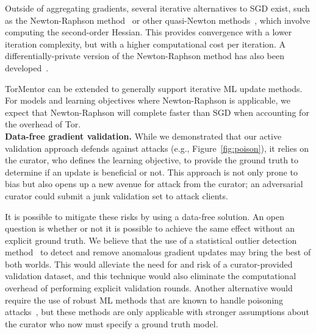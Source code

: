 Outside of aggregating gradients, several iterative alternatives to SGD
exist, such as the Newton-Raphson method~\cite{Jennrich:1969} or other
quasi-Newton methods~\cite{Haelterman:2009}, which involve computing
the second-order Hessian. This provides convergence with a lower
iteration complexity, but with a higher computational cost per
iteration. A differentially-private version of the Newton-Raphson method
has also been developed~\cite{Ji:2014}.

TorMentor can be extended to generally support iterative ML update
methods. For models and learning objectives where Newton-Raphson is
applicable, we expect that Newton-Raphson will complete faster than SGD
when accounting for the overhead of Tor.\\

\noindent \textbf{Data-free gradient validation.}
%
While we demonstrated that our active validation approach defends against
attacks (e.g., Figure~\ref{fig:poison}), it relies on the curator, who
defines the learning objective, to provide the ground truth to
determine if an update is beneficial or not. This approach is not only
prone to bias but also opens up a new avenue for attack from the
curator; an adversarial curator could submit a junk validation set to
attack clients.

It is possible to mitigate these risks by using a data-free
solution. An open question is whether or not it is possible to achieve
the same effect without an explicit ground truth. We believe that the
use of a statistical outlier detection method~\cite{Hodge:2004} to
detect and remove anomalous gradient updates may bring the best of
both worlds. This would alleviate the need for and risk of a
curator-provided validation dataset, and this technique would also eliminate the
computational overhead of performing explicit validation rounds.
Another alternative would require the use of robust ML methods that are
known to handle poisoning attacks~\cite{Barreno:2010, 
Mozaffari-Kermani:2015}, but these methods are only applicable with
stronger assumptions about the curator who now must specify a ground
truth model.
